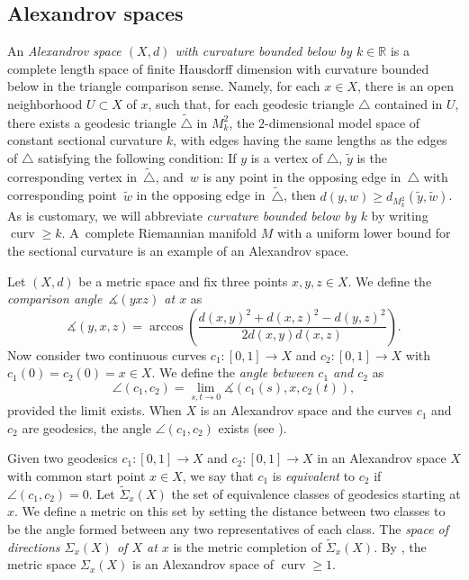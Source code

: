 \documentclass[10pt,a4paper]{amsart}
\numberwithin{equation}{section}
\theoremstyle{definition}
\DeclareMathOperator{\curv}{curv}
\newcommand{\R}{\mathbb{R}} %
\begin{document}
	
		
\subsection{Alexandrov spaces}
\label{S: Alexandrov spaces}
An \emph{Alexandrov space $(X, d)$ with curvature bounded below by $k\in \R$} is a complete length space of finite Hausdorff dimension with curvature bounded below in the triangle comparison sense. Namely, for each $x\in X$, there is an open neighborhood $U\subset X$ of $x$, such that, for each geodesic triangle $\triangle$ contained in $U$, there exists a geodesic triangle $\widetilde{\triangle}$ in $M^2_k$, the $2$-dimensional model space of constant sectional curvature $k$, with edges having the same lengths as the edges of $\triangle$ satisfying the following condition: If $y$ is a vertex of $\triangle$, $\widetilde{y}$ is the corresponding vertex in~$\widetilde{\triangle}$, and~$w$ is any point in the opposing edge in~$\triangle$ with corresponding point~$\widetilde{w}$ in the opposing edge in~$\widetilde{\triangle}$, then
$
	d(y,w) \geq d_{M^2_k}(\widetilde{y},\widetilde{w})$.
As is customary, we will abbreviate \emph{curvature bounded below by $k$} by writing $\curv\geq k$. A~complete Riemannian manifold $M$ with a uniform lower bound for the sectional curvature is an example of an Alexandrov space.

Let $(X,d)$ be a metric space and fix three points $x,y,z\in X$. We define the \emph{comparison angle~$\measuredangle(yxz)$ at $x$} as
\[
	\measuredangle (y,x,z) = \arccos\left(\frac{d(x,y)^2+d(x,z)^2-d(y,z)^2}{2d(x,y)d(x,z)} \right).
\]
Now consider two continuous curves $c_1\colon [0,1]\to X$ and $c_2\colon [0,1]\to X$ with $c_1(0) = c_2(0) = {x\in X}$. We define the \emph{angle between $c_1$ and $c_2$} as
\[
	\angle (c_1,c_2) = \lim_{s,t\to 0}	\measuredangle (c_1(s),x,c_2(t)),
\]
provided the limit exists. When $X$ is an Alexandrov space and the curves $c_1$ and $c_2$ are geodesics, the angle $\angle (c_1,c_2)$ exists (see \cite[Proposition 4.3.2]{BuragoBuragoIvanov}).

Given two geodesics $c_1\colon [0,1]\to X$ and $c_2\colon [0,1]\to X$ in an Alexandrov space $X$ with common start point $x\in X$, we say that $c_1$ is \emph{equivalent} to $c_2$ if $\angle (c_1,c_2) =0$. Let $\widetilde{\Sigma}_x(X)$ the set of equivalence classes of geodesics starting at $x$. We define a metric on this set by setting the distance between two classes to be the angle formed between any two representatives of each class. The \emph{space of directions $\Sigma_x(X)$ of $X$ at $x$} is the metric completion of $\widetilde{\Sigma}_x(X)$. By \cite[Corollaries 7.10 and 7.11]{BuragoGromovPerelman1992}, the metric space $\Sigma_x(X)$ is an Alexandrov space of $\curv \geq 1$.
\end{document}
